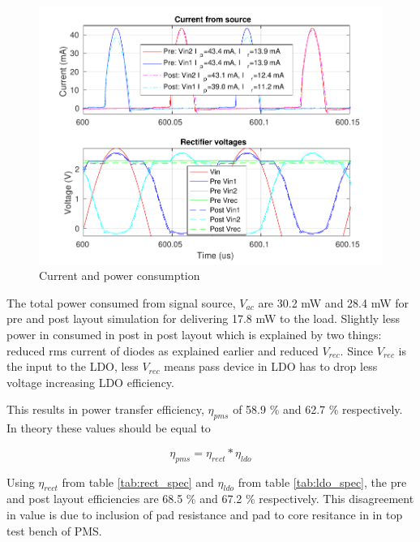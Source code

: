 \documentclass[12pt,a4paper,UKenglish]{report}
\begin{document}
\begin{figure} [H]
  \centering
  \includegraphics[width=\textwidth]{img/pms/pms2_VIrect_both.pdf} 
 \caption{Current and power consumption} 
\label{fig:pms_PI}  
\end{figure}

The total power consumed from signal source, $V_{ac}$ are 30.2 mW and 28.4 mW for pre and post layout simulation for delivering 17.8 mW to 
the load. Slightly less power in consumed in post in post layout which  is explained by two things: reduced rms current of 
diodes as explained earlier and reduced $V_{rec}$. Since $V_{rec}$ is the input to the LDO, less $V_{rec}$ means pass device in LDO has 
to drop less voltage increasing LDO efficiency.

This results in power transfer efficiency, $\eta_{pms}$ of 58.9  \% and 62.7  \% respectively. In 
theory these values should be equal to 

\begin{equation} \label{eq:wpt_effi} 
\eta_{pms} = \eta_{rect}*\eta_{ldo}
\end{equation}

Using $\eta_{rect}$ from table \ref{tab:rect_spec} and $\eta_{ldo}$ from table \ref{tab:ldo_spec}, the pre and post 
layout efficiencies are 68.5  \% and 67.2  \% respectively. This disagreement in value is due to inclusion of pad 
resistance and pad to  core resitance in in top test bench of PMS.\\
\end{document}
